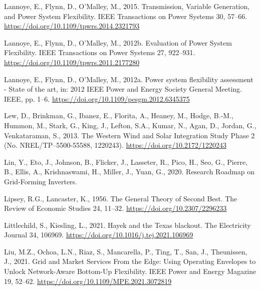 \documentclass[12pt,a4paper,]{report}
\newlength{\cslhangindent}
\newenvironment{CSLReferences}[2] %
 {%
  \setlength{\parindent}{0pt}
  \ifodd #1 \everypar{\setlength{\hangindent}{\cslhangindent}}\ignorespaces\fi
  \ifnum #2 > 0
  \setlength{\parskip}{#2\baselineskip}
  \fi
 }%
 {}
\begin{document}
\begin{CSLReferences}{1}{0}
\leavevmode{}%
Lannoye, E., Flynn, D., O'Malley, M., 2015. Transmission, {Variable
Generation}, and {Power System Flexibility}. IEEE Transactions on Power
Systems 30, 57--66. \url{https://doi.org/10.1109/tpwrs.2014.2321793}

\leavevmode{}%
Lannoye, E., Flynn, D., O'Malley, M., 2012b. Evaluation of {Power System
Flexibility}. IEEE Transactions on Power Systems 27, 922--931.
\url{https://doi.org/10.1109/tpwrs.2011.2177280}

\leavevmode{}%
Lannoye, E., Flynn, D., O'Malley, M., 2012a. Power system flexibility
assessment - {State} of the art, in: 2012 {IEEE Power} and {Energy
Society General Meeting}. IEEE, pp. 1--6.
\url{https://doi.org/10.1109/pesgm.2012.6345375}

\leavevmode{}%
Lew, D., Brinkman, G., Ibanez, E., Florita, A., Heaney, M., Hodge,
B.-M., Hummon, M., Stark, G., King, J., Lefton, S.A., Kumar, N., Agan,
D., Jordan, G., Venkataraman, S., 2013. The {Western Wind} and {Solar
Integration Study Phase} 2 (No. NREL/TP--5500-55588, 1220243).
\url{https://doi.org/10.2172/1220243}

\leavevmode{}%
Lin, Y., Eto, J., Johnson, B., Flicker, J., Lasseter, R., Pico, H., Seo,
G., Pierre, B., Ellis, A., Krishnaswami, H., Miller, J., Yuan, G., 2020.
Research {Roadmap} on {Grid-Forming Inverters}.

\leavevmode{}%
Lipsey, R.G., Lancaster, K., 1956. The {General Theory} of {Second
Best}. The Review of Economic Studies 24, 11--32.
\url{https://doi.org/10.2307/2296233}

\leavevmode{}%
Littlechild, S., Kiesling, L., 2021. Hayek and the {Texas} blackout. The
Electricity Journal 34, 106969.
\url{https://doi.org/10.1016/j.tej.2021.106969}

\leavevmode{}%
Liu, M.Z., Ochoa, L.N., Riaz, S., Mancarella, P., Ting, T., San, J.,
Theunissen, J., 2021. Grid and {Market Services From} the {Edge}: {Using
Operating Envelopes} to {Unlock Network-Aware Bottom-Up Flexibility}.
IEEE Power and Energy Magazine 19, 52--62.
\url{https://doi.org/10.1109/MPE.2021.3072819}


\end{CSLReferences}
\end{document}
